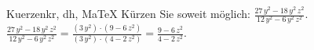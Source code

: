 \begin{MAufgabe}{Kuerzen}{kr, dh, MaTeX}
K\"urzen Sie soweit m\"oglich: $\frac{27\, y^2 - 18\, y^2\, z^2}{12\, y^2 - 6\, y^2\, z^2}$.\\ 
\ifLsg\MLoesung
\quad $\frac{27\, y^2 - 18\, y^2\, z^2}{12\, y^2 - 6\, y^2\, z^2}=\frac{(3\, y^2)\cdot(9 - 6\, z^2)}{(3\, y^2)\cdot(4 - 2\, z^2)}=\frac{9 - 6\, z^2}{4 - 2\, z^2}$.\else\relax\fi
 \end{MAufgabe}